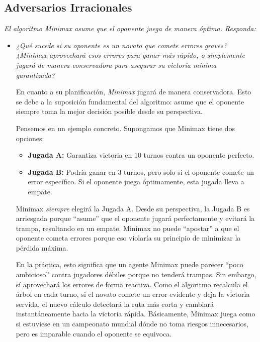 \documentclass[11pt]{article}
\begin{document}
\subsection*{Adversarios Irracionales}

\textit{El algoritmo Minimax asume que el oponente juega de manera óptima. Responda:}

\begin{itemize}[leftmargin=*, itemsep=0.8em]

	\item \textit{¿Qué sucede si su oponente es un novato que comete errores graves? ¿Minimax aprovechará esos
		      errores para ganar más rápido, o simplemente jugará de manera conservadora para asegurar su
		      victoria mínima garantizada?}

	      En cuanto a su planificación, \textit{Minimax} jugará de manera conservadora. Esto se debe a la suposición fundamental
	      del algoritmo: asume que el oponente siempre toma la mejor decisión posible desde su perspectiva.

	      Pensemos en un ejemplo concreto. Supongamos que Minimax tiene dos opciones:
	      \begin{itemize}
		      \item \textbf{Jugada A:} Garantiza victoria en 10 turnos contra un oponente perfecto.
		      \item \textbf{Jugada B:} Podría ganar en 3 turnos, pero solo si el oponente comete un error específico.
		            Si el oponente juega óptimamente, esta jugada lleva a empate.
	      \end{itemize}

	      Minimax \textit{siempre} elegirá la Jugada A. Desde su perspectiva, la Jugada B es arriesgada porque ``asume''
	      que el oponente jugará perfectamente y evitará la trampa, resultando en un empate. Minimax no puede ``apostar'' a
	      que el oponente cometa errores porque eso violaría su principio de minimizar la pérdida máxima.

	      En la práctica, esto significa que un agente Minimax puede parecer ``poco ambicioso'' contra jugadores débiles
	      porque no tenderá trampas. Sin embargo, sí aprovechará los errores de forma reactiva. Como el algoritmo recalcula
	      el árbol en cada turno, si el novato comete un error evidente y deja la victoria servida, el nuevo cálculo detectará
	      la ruta más corta y cambiará instantáneamente hacia la victoria rápida. Básicamente, Minimax juega como si estuviese
	      en un campeonato mundial dónde no toma riesgos innecesarios, pero es imparable cuando el oponente se equivoca.


\end{itemize}
\end{document}
